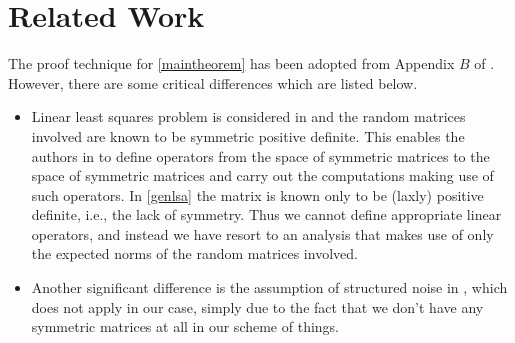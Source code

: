 \section{Related Work}
\label{sec:related}
The proof technique for \cref{maintheorem} has been adopted from Appendix $B$ of \cite{bachharder} . However, there are some critical differences which are listed below.
\begin{itemize}
\item Linear least squares problem is considered in \cite{bachharder} and the random matrices involved are known to be symmetric positive definite. This enables the authors in \cite{bachharder} to define operators from the space of symmetric matrices to the space of symmetric matrices and carry out the computations making use of such operators. In \cref{genlsa} the matrix is known only to be (laxly) positive definite, i.e., the lack of symmetry.
Thus we cannot define appropriate linear operators, and instead we have resort to an analysis that makes use of only the expected norms of the random matrices involved.
\item Another significant difference is the assumption of structured noise in \cite{bachharder}, which does not apply in our case, simply due to the fact that we don't have any symmetric matrices at all in our scheme of things.
\end{itemize}
